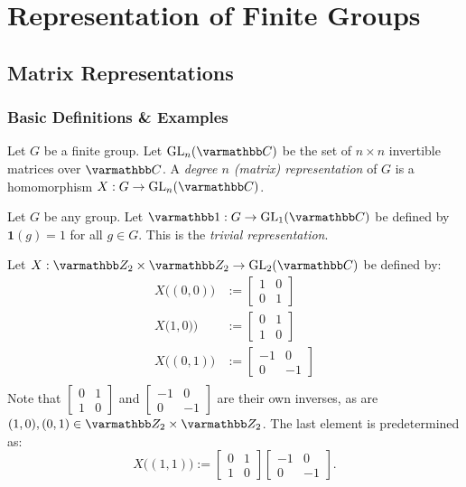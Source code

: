 \chapter{Representation of Finite Groups}

\section{Matrix Representations}

\subsection{Basic Definitions \& Examples}

\begin{definition}
	Let $G$ be a finite group. Let $\operatorname{GL}_n(\bfC)$ be the set of $n \times n$ invertible matrices over $\bfC$. A \emph{degree $n$ (matrix) representation} of $G$ is a homomorphism $X:G \rightarrow \operatorname{GL}_n(\bfC)$.
\end{definition}

\begin{example}
	Let $G$ be any group. Let $\mathbf{1}:G \rightarrow \GL_1(\bfC)$ be defined by $\mathbf{1}(g) = 1$ for all $g \in G$. This is the \textit{trivial representation}.
\end{example}

\begin{example}
	Let $X:\bfZ_2 \times \bfZ_2 \rightarrow \GL_2(\bfC)$ be defined by:
	\begin{align*}
		X\bigl((0,0) \bigr) &:= \begin{bmatrix} 1 & 0 \\ 0 & 1  \end{bmatrix} \\ 
		X\bigl(1,0) \bigr) &:= \begin{bmatrix} 0 & 1 \\ 1 & 0  \end{bmatrix} \\ 
		X\bigl((0,1) \bigr) &:= \begin{bmatrix} -1 & 0 \\ 0 & -1  \end{bmatrix} \\ 
	\end{align*}
	Note that $\begin{bmatrix} 0 & 1 \\ 1 & 0 \end{bmatrix}$ and $\begin{bmatrix} -1 & 0 \\ 0 & -1 \end{bmatrix}$ are their own inverses, as are $(1,0), (0,1) \in \bfZ_2 \times \bfZ_2$. The last element is predetermined as:
	\[
		X\bigl((1,1)\bigr) := \begin{bmatrix} 0 & 1 \\ 1 & 0 \end{bmatrix} \begin{bmatrix} -1 & 0 \\ 0 & - 1 \end{bmatrix}. 
	\] 
\end{example}

